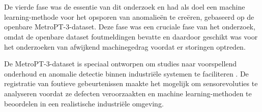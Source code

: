 

\section{}%
\label{sec: Ontwikkelen van een voorspellend onderhoud-methodiek op de gekozen publieke dataset}

De vierde fase was de essentie van dit onderzoek en had als doel een machine learning-methode voor het opsporen van anomalieën te creëren, gebaseerd op de openbare MetroPT-3-dataset. Deze fase was een cruciale fase van het onderzoek, omdat de openbare dataset foutmeldingen bevatte en daardoor geschikt was voor het onderzoeken van afwijkend machinegedrag voordat er storingen optreden.

De MetroPT-3-dataset is speciaal ontworpen om studies naar voorspellend onderhoud en anomalie detectie binnen industriële systemen te faciliteren \autocite{Veloso2022}. De registratie van foutieve gebeurtenissen maakte het mogelijk om sensorevoluties te analyseren voordat ze defecten veroorzaakten en machine learning-methoden te beoordelen in een realistische industriële omgeving.

